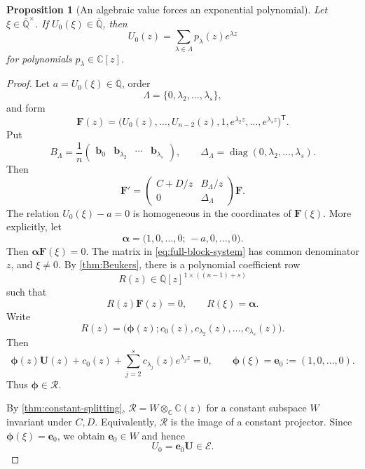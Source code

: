 \documentclass[11pt]{article}
\numberwithin{equation}{section}
\newtheorem{proposition}[proposition]{Proposition}
\theoremstyle{definition}
\theoremstyle{remark}
\newcommand{\C}{\mathbb C}
\newcommand{\Qbar}{\overline{\mathbb Q}}
\newcommand{\diag}{\operatorname{diag}}
\newcommand{\Ecal}{\mathcal E}
\newcommand{\Rcal}{\mathcal R}
\begin{document}
\begin{proposition}[An algebraic value forces an exponential polynomial]
\label{prop:value-to-exp-poly}
Let $\xi\in\Qbar^\times$.  If $U_0(\xi)\in\Qbar$, then
\begin{equation}\label{eq:exp-polynomial-U0}
  U_0(z)=\sum_{\lambda\in\Lambda}p_\lambda(z)e^{\lambda z}
\end{equation}
for polynomials $p_\lambda\in\C[z]$.
\end{proposition}

\begin{proof}
Let $a=U_0(\xi)\in\Qbar$, order
\[
  \Lambda=\{0,\lambda_2,\ldots,\lambda_s\},
\]
and form
\[
  \mathbf F(z)
  =\bigl(
    U_0(z),\ldots,U_{n-2}(z),
    1,e^{\lambda_2z},\ldots,e^{\lambda_sz}
  \bigr)^{\mathsf T}.
\]
Put
\[
  B_\Lambda=\frac1n
  \begin{pmatrix}
    \mathbf b_0&\mathbf b_{\lambda_2}&\cdots&\mathbf b_{\lambda_s}
  \end{pmatrix},
  \qquad
  \Delta_\Lambda=\diag(0,\lambda_2,\ldots,\lambda_s).
\]
Then
\begin{equation}\label{eq:full-block-system}
  \mathbf F'
  =\begin{pmatrix}
      C+D/z&B_\Lambda/z\\
      0&\Delta_\Lambda
    \end{pmatrix}\mathbf F.
\end{equation}
The relation $U_0(\xi)-a=0$ is homogeneous in the coordinates of
$\mathbf F(\xi)$.  More explicitly, let
\[
  \boldsymbol\alpha
  =\bigl(1,0,\ldots,0;\,-a,0,\ldots,0\bigr).
\]
Then $\boldsymbol\alpha\mathbf F(\xi)=0$.  The matrix in
\eqref{eq:full-block-system} has common denominator $z$, and
$\xi\ne0$.  By \cref{thm:Beukers}, there is a polynomial coefficient row
\[
  R(z)\in\Qbar[z]^{1\times((n-1)+s)}
\]
such that
\[
  R(z)\mathbf F(z)=0,
  \qquad
  R(\xi)=\boldsymbol\alpha.
\]
Write
\[
  R(z)=\bigl(
    \boldsymbol\phi(z);
    c_0(z),c_{\lambda_2}(z),\ldots,c_{\lambda_s}(z)
  \bigr).
\]
Then
\begin{equation}\label{eq:lifted-relation}
  \boldsymbol\phi(z)\mathbf U(z)
  +c_0(z)+\sum_{j=2}^s c_{\lambda_j}(z)e^{\lambda_jz}=0,
  \qquad
  \boldsymbol\phi(\xi)=\mathbf e_0:=(1,0,\ldots,0).
\end{equation}
Thus $\boldsymbol\phi\in\Rcal$.

By \cref{thm:constant-splitting},
$\Rcal=W\otimes_\C\C(z)$ for a constant subspace $W$ invariant under $C,D$.
Equivalently, $\Rcal$ is the image of a constant projector.  Since
$\boldsymbol\phi(\xi)=\mathbf e_0$, we obtain $\mathbf e_0\in W$ and hence
\[
  U_0=\mathbf e_0\mathbf U\in\Ecal.
\]


\end{proof}
\end{document}

